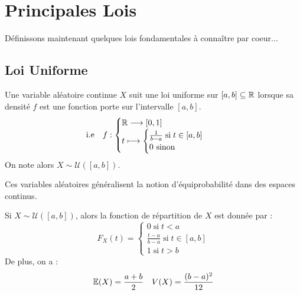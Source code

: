 
\section{Principales Lois}

Définissons maintenant quelques lois fondamentales à connaître par coeur...

\subsection{Loi Uniforme}

\begin{definition}
    Une variable aléatoire continue $X$ suit une loi uniforme sur $[a,b] \subseteq \mathbb{R}$ lorsque sa densité $f$ 
    est une fonction porte sur l'intervalle $[a,b]$. 
        \[ \text{i.e} \quad f : 
            \begin{cases}
                \mathbb{R} \longrightarrow [0,1] \\ 
                t \longmapsto   \begin{cases}
                                    \frac{1}{b-a} \; \text{si} \; t \in [a,b] \\ 
                                    0 \text{ sinon}
                                \end{cases}
            \end{cases} \] 
    On note alors $X \sim \mathcal{U}([a,b])$. 
\end{definition}

Ces variables aléatoires généralisent la notion d'équiprobabilité dans des espaces continus. 

\begin{proposition}
    Si $X \sim \mathcal{U}([a,b])$, alors la fonction de répartition de $X$ est donnée par : 
        \[ F_X(t) = 
            \begin{cases}
                0 \; \text{si} \; t < a \\ 
                \frac{t-a}{b-a} \; \text{si} \; t \in [a,b] \\ 
                1 \; \text{si} \; t > b 
            \end{cases} \] 
    De plus, on a : 
        \[ \mathbb{E}(X) = \frac{a + b}{2} \quad V(X) = \frac{(b-a)^2}{12} \] 
\end{proposition}


